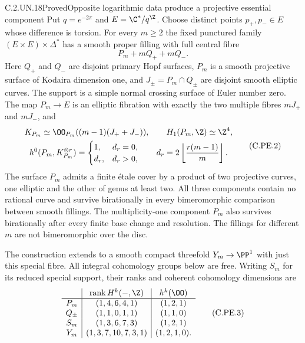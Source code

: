 \begin{statement}{C.2.UN.18}{Proved}{Opposite logarithmic data produce a projective essential component}
Put $q=e^{-2\pi}$ and $E=\C^*/q^{\Z}$. Choose distinct
points $p_+,p_-\in E$ whose difference is torsion.
For every $m\ge2$ the fixed punctured family
$(E\times E)\times\Delta^*$ has a smooth proper filling
with full central fibre
\[
                         P_m+mQ_++mQ_-.                 \tag{C.PE.1}
\]
Here $Q_+$ and $Q_-$ are disjoint primary Hopf surfaces,
$P_m$ is a smooth projective surface of Kodaira dimension
one, and $J_\pm=P_m\cap Q_\pm$ are disjoint smooth
elliptic curves. The support is a simple normal crossing
surface of Euler number zero. The map $P_m\to E$ is an
elliptic fibration with exactly the two multiple fibres
$mJ_+$ and $mJ_-$, and
\[
 \begin{gathered}
 K_{P_m}\simeq\OO_{P_m}((m-1)(J_++J_-)),\qquad
 H_1(P_m,\Z)\simeq\Z^4,\\
 h^0(P_m,K_{P_m}^{\otimes r})=
 \begin{cases}1,&d_r=0,\\d_r,&d_r>0,\end{cases}
 \qquad d_r=2\left\lfloor\frac{r(m-1)}m\right\rfloor.
 \end{gathered}                                         \tag{C.PE.2}
\]
The surface $P_m$ admits a finite \'etale cover by a
product of two projective curves, one elliptic and the
other of genus at least two. All three components contain
no rational curve and survive birationally in every
bimeromorphic comparison between smooth fillings. The
multiplicity-one component $P_m$ also survives birationally
after every finite base change and resolution. The
fillings for different $m$ are not bimeromorphic over the
disc.

The construction extends to a smooth compact threefold
$Y_m\to\PP^1$ with just this special fibre. All integral
cohomology groups below are free. Writing $S_m$ for its
reduced special support, their ranks and coherent
cohomology dimensions are
\[
 \begin{array}{c|c|c}
 &\operatorname{rank}H^k(-,\Z)&h^k(\OO)\\ \hline
 P_m&(1,4,6,4,1)&(1,2,1)\\
 Q_\pm&(1,1,0,1,1)&(1,1,0)\\
 S_m&(1,3,6,7,3)&(1,2,1)\\
 Y_m&(1,3,7,10,7,3,1)&(1,2,1,0).
 \end{array}                                           \tag{C.PE.3}
\]
\end{statement}
